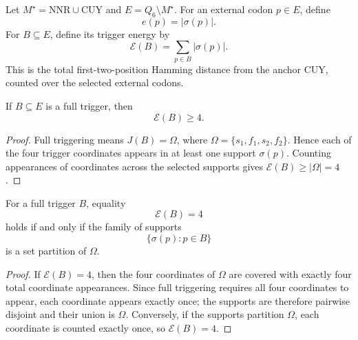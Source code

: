 \begin{definition}
\label{def:philosophy-trigger-energy}
Let $M^{\star}=\mathrm{NNR}\cup\mathrm{CUY}$ and
$E=Q_{6}\setminus M^{\star}$. For an external codon $p\in E$, define
$$
  e(p)=|\sigma(p)|.
$$
For $B\subseteq E$, define its trigger energy by
$$
  \mathcal{E}(B)=\sum_{p\in B}|\sigma(p)|.
$$
This is the total first-two-position Hamming distance from the anchor
$\mathrm{CUY}$, counted over the selected external codons.
\end{definition}

\begin{theorem}
\label{thm:philosophy-trigger-energy-lower-bound}
If $B\subseteq E$ is a full trigger, then
$$
  \mathcal{E}(B)\geq 4.
$$
\end{theorem}
\begin{proof}
Full triggering means $J(B)=\Omega$, where
$\Omega=\{s_{1},f_{1},s_{2},f_{2}\}$. Hence each of the four trigger
coordinates appears in at least one support $\sigma(p)$. Counting
appearances of coordinates across the selected supports gives
$\mathcal{E}(B)\geq|\Omega|=4$.
\end{proof}

\begin{theorem}
\label{thm:philosophy-trigger-energy-partition-criterion}
For a full trigger $B$, equality
$$
  \mathcal{E}(B)=4
$$
holds if and only if the family of supports
$$
  \{\sigma(p):p\in B\}
$$
is a set partition of $\Omega$.
\end{theorem}
\begin{proof}
If $\mathcal{E}(B)=4$, then the four coordinates of $\Omega$ are
covered with exactly four total coordinate appearances. Since full
triggering requires all four coordinates to appear, each coordinate
appears exactly once; the supports are therefore pairwise disjoint and
their union is $\Omega$. Conversely, if the supports partition
$\Omega$, each coordinate is counted exactly once, so
$\mathcal{E}(B)=4$.
\end{proof}

